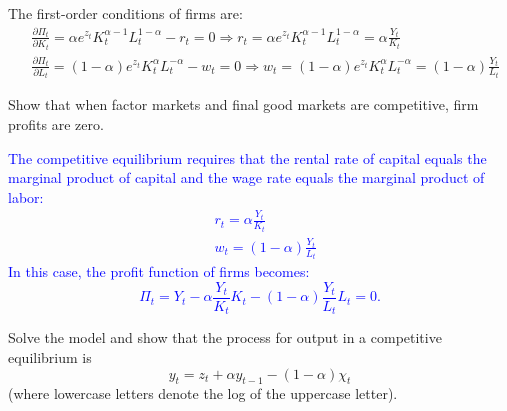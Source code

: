 \begin{solution}
{\[        \]
        The first-order conditions of firms are:
        \begin{align}
            & \frac{\partial \Pi_t}{\partial K_t} = \alpha e^{z_t} K_t^{\alpha-1} L_t^{1-\alpha} - r_t = 0 \Rightarrow r_t = \alpha e^{z_t} K_t^{\alpha-1} L_t^{1-\alpha} = \alpha \frac{Y_t}{K_t}\label{1.4} \\
            & \frac{\partial \Pi_t}{\partial L_t} = (1-\alpha) e^{z_t} K_t^\alpha L_t^{-\alpha} - w_t = 0 \Rightarrow w_t = (1-\alpha) e^{z_t} K_t^\alpha L_t^{-\alpha} = (1-\alpha )\frac{Y_t}{L_t}\label{1.5}
        \end{align}
    }
\end{solution}

\begin{problem*}[3]
    Show that when factor markets and final good markets are competitive, firm profits are zero.
\end{problem*}

\begin{solution}
    \textcolor{blue}{
        The competitive equilibrium requires that the rental rate of capital equals the marginal product of capital and the wage rate equals the marginal product of labor:
    \begin{align*}
        & r_t = \alpha \frac{Y_t}{K_t}  \\
        & w_t = (1-\alpha) \frac{Y_t}{L_t}
    \end{align*}
    In this case, the profit function of firms becomes:
    \[
    \Pi_t = Y_t - \alpha \frac{Y_t}{K_t} K_t - (1-\alpha) \frac{Y_t}{L_t} L_t = 0.
    \]
    }
\end{solution}

\begin{problem*}[4]
    Solve the model and show that the process for output in a competitive equilibrium is
    $$y_t=z_t+\alpha y_{t-1}-(1-\alpha)\chi_t$$ 
    (where lowercase letters denote the log of the uppercase letter).
\end{problem*}

